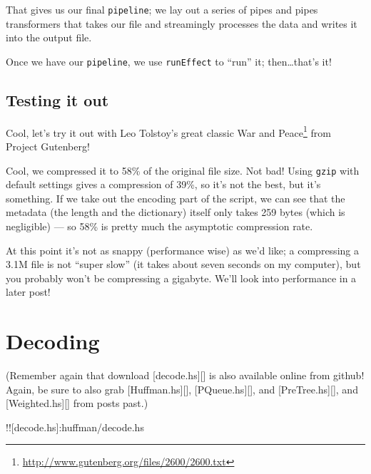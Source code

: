 \documentclass[]{article}
\newenvironment{Shaded}{}{}
\newcommand{\KeywordTok}[1]{\textcolor[rgb]{0.00,0.44,0.13}{\textbf{{#1}}}}
\newcommand{\CommentTok}[1]{\textcolor[rgb]{0.38,0.63,0.69}{\textit{{#1}}}}
\newcommand{\NormalTok}[1]{{#1}}
\renewcommand{\href}[2]{#2\footnote{\url{#1}}}
\begin{document}
That gives us our final \texttt{pipeline}; we lay out a series of pipes
and pipes transformers that takes our file and streamingly processes the
data and writes it into the output file.

Once we have our \texttt{pipeline}, we use \texttt{runEffect} to ``run''
it; then\ldots{}that's it!

\subsection{Testing it out}\label{testing-it-out}

Cool, let's try it out with Leo Tolstoy's great classic
\href{http://www.gutenberg.org/files/2600/2600.txt}{War and Peace} from
Project Gutenberg!

\begin{Shaded}
\end{Shaded}

Cool, we compressed it to 58\% of the original file size. Not bad! Using
\texttt{gzip} with default settings gives a compression of 39\%, so it's
not the best, but it's something. If we take out the encoding part of
the script, we can see that the metadata (the length and the dictionary)
itself only takes 259 bytes (which is negligible) --- so 58\% is pretty
much the asymptotic compression rate.

At this point it's not as snappy (performance wise) as we'd like; a
compressing a 3.1M file is not ``super slow'' (it takes about seven
seconds on my computer), but you probably won't be compressing a
gigabyte. We'll look into performance in a later post!

\section{Decoding}\label{decoding}

(Remember again that download {[}decode.hs{]}{[}{]} is also available
online from github! Again, be sure to also grab {[}Huffman.hs{]}{[}{]},
{[}PQueue.hs{]}{[}{]}, and {[}PreTree.hs{]}{[}{]}, and
{[}Weighted.hs{]}{[}{]} from posts past.)

!!{[}decode.hs{]}:huffman/decode.hs
\end{document}
